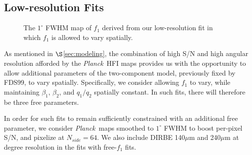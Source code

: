 \documentclass{emulateapj}
\newcommand{\PLANCK}{{\it Planck}}
\begin{document}

\subsection{Low-resolution Fits}
\label{sec:lores}



\begin{figure}
\begin{center}
\caption{\label{fig:f1} The $1^{\circ}$ FWHM map of $f_1$ derived from our 
low-resolution fit in which $f_1$ is allowed to vary spatially.}
\end{center}
\end{figure}

As mentioned in $\S$\ref{sec:modeling}, the combination of high S/N and high 
angular resolution afforded by the \PLANCK~HFI maps provides us with the 
opportunity to allow additional parameters of the two-component model, 
previously fixed by FDS99, to vary spatially. Specifically, we consider
allowing $f_1$ to vary, while maintaining $\beta_1$, $\beta_2$, and $q_1/q_2$
spatially constant. In such fits, there will therefore be three free 
parameters.


In order for such fits to remain sufficiently constrained with an additional 
free parameter, we consider \PLANCK~maps smoothed to $1^{\circ}$ FWHM to 
boost per-pixel S/N, and pixelize at $N_{side}=64$. We also include DIRBE 
140$\mu$m and 240$\mu$m at degree resolution in the fits with free-$f_1$ fits.
\end{document}
